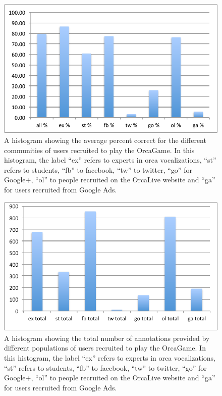 \begin{figure}[h]
\centering
\includegraphics[width=\columnwidth]{figures/orcagamePercentCorrect}
\caption{A histogram showing the average percent correct for the
  different communities of users recruited to play the OrcaGame.  In
  this histogram, the label ``ex'' refers to experts in orca
  vocalizations, ``st'' refers to students, ``fb'' to facebook, ``tw''
to twitter, ``go'' for Google+, ``ol'' to people recruited on the
OrcaLive website and ``ga'' for users recruited from Google Ads.}
\label{fig:OrcaGamePercentCorrect}
\end{figure}

\begin{figure}[h]
\centering
\includegraphics[width=\columnwidth]{figures/orcagameTotalNum}
\caption{A histogram showing the total number of annotations provided
  by different populations of users recruited to play the OrcaGame.   In
  this histogram, the label ``ex'' refers to experts in orca
  vocalizations, ``st'' refers to students, ``fb'' to facebook, ``tw''
to twitter, ``go'' for Google+, ``ol'' to people recruited on the
OrcaLive website and ``ga'' for users recruited from Google Ads.}
\label{fig:OrcaGameTotalNum}
\end{figure}

